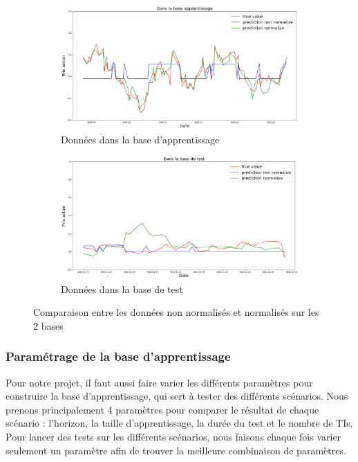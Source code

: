 \begin{figure}[H]
\centering
	\begin{subfigure}{.5\textwidth}
	\centering
	\includegraphics[width=.9\linewidth, scale=0.2]
	{plot/norma.png}
	\caption{Données dans la base d'apprentissage}
	\label{fig:Base_A}
	\end{subfigure}%
	\begin{subfigure}{.5\textwidth}
	\centering
	\includegraphics[width=.9\linewidth, scale=0.2]
	{plot/non_norma.png}
	\caption{Données dans la base de test}
	\label{fig:Base_T}
	\end{subfigure}
\caption{Comparaison entre les données non normalisés et normalisés sur les 2 bases}
\label{fig: normalisation}
\end{figure}

\subsubsection{Paramétrage de la base d'apprentissage}

Pour notre projet, il faut aussi faire varier les différents paramètres pour construire la base d'apprentissage, qui sert à tester des différents scénarios. Nous prenons principalement 4 paramètres pour comparer le résultat de chaque scénario : l'horizon, la taille d'apprentissage, la durée du test et le nombre de TIs. Pour lancer des tests sur les différents scénarios, nous faisons chaque fois varier seulement un paramètre afin de trouver la meilleure combinaison de paramètres.\\

